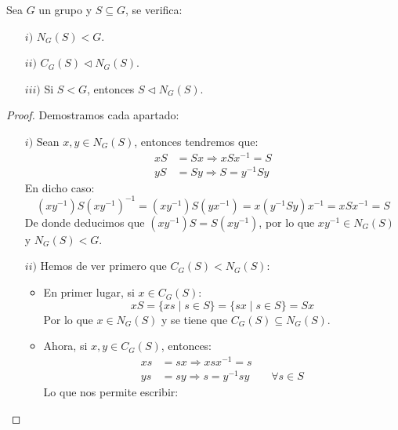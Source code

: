 \begin{prop} %
    Sea $G$ un grupo y $S\subseteq G$, se verifica:
    \begin{enumerate}
        \item[$i)$] $N_G(S) < G$.
        \item[$ii)$] $C_G(S) \lhd N_G(S)$.
        \item[$iii)$] Si $S<G$, entonces $S\lhd N_G(S)$.
    \end{enumerate}
    \begin{proof}
        Demostramos cada apartado:
        \begin{enumerate}
            \item[$i)$] Sean $x,y\in N_G(S)$, entonces tendremos que:
                \begin{align*}
                    xS &= Sx \Longrightarrow xSx^{-1} = S \\
                    yS &= Sy \Longrightarrow S = y^{-1}Sy
                \end{align*}
                En dicho caso:
                \begin{equation*}
                    (xy^{-1})S{(xy^{-1})}^{-1} = (xy^{-1})S(yx^{-1}) = x(y^{-1}Sy)x^{-1} = xSx^{-1} = S
                \end{equation*}
                De donde deducimos que $(xy^{-1})S = S(xy^{-1})$, por lo que $xy^{-1}\in N_G(S)$ y $N_G(S) < G$.
            \item[$ii)$] Hemos de ver primero que $C_G(S) < N_G(S)$:
                \begin{itemize}
                    \item En primer lugar, si $x\in C_G(S)$:
                        \begin{equation*}
                            xS = \{xs \mid s\in S\} = \{sx \mid s\in S\} = Sx
                        \end{equation*}
                        Por lo que $x\in N_G(S)$ y se tiene que $C_G(S) \subseteq N_G(S)$.
                    \item Ahora, si $x,y\in C_G(S)$, entonces:
                        \begin{align*}
                            xs &= sx \Longrightarrow xsx^{-1} = s \\
                            ys &= sy \Longrightarrow s = y^{-1}sy \qquad \forall s\in S
                        \end{align*}
                        Lo que nos permite escribir:
                        \begin{equation*}

\end{equation*}
\end{itemize}
\end{enumerate}
\end{proof}
\end{prop}
